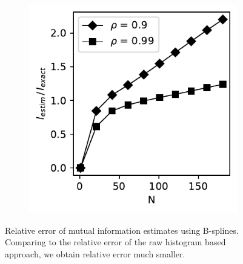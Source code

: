 \documentclass[../Thesis.tex]{subfiles}
\begin{document}
\begin{figure}[H]
\begin{subfigure}[t]{0.32\textwidth}
        \caption{}
    \end{subfigure}%
    ~
    \begin{subfigure}[t]{0.32\textwidth}
        \centering
        \includegraphics[width=\linewidth]{figures/ND examples/MI calc/gaussian example original zoom - B-spline.pdf}
        \caption{}
    \end{subfigure}
    \caption{Relative error of mutual information estimates using B-splines. Comparing to the relative error of the raw histogram based approach, we obtain relative error much smaller.}
    \label{fig:B-spline approach results MI - relative error}
\end{figure}
\end{document}
